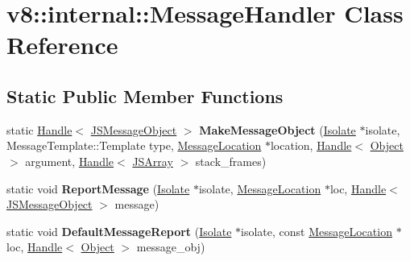 \hypertarget{classv8_1_1internal_1_1_message_handler}{}\section{v8\+:\+:internal\+:\+:Message\+Handler Class Reference}
\label{classv8_1_1internal_1_1_message_handler}
\subsection*{Static Public Member Functions}
\begin{DoxyCompactItemize}
\item 
static \hyperlink{classv8_1_1internal_1_1_handle}{Handle}$<$ \hyperlink{classv8_1_1internal_1_1_j_s_message_object}{J\+S\+Message\+Object} $>$ {\bfseries Make\+Message\+Object} (\hyperlink{classv8_1_1internal_1_1_isolate}{Isolate} $\ast$isolate, Message\+Template\+::\+Template type, \hyperlink{classv8_1_1internal_1_1_message_location}{Message\+Location} $\ast$location, \hyperlink{classv8_1_1internal_1_1_handle}{Handle}$<$ \hyperlink{classv8_1_1internal_1_1_object}{Object} $>$ argument, \hyperlink{classv8_1_1internal_1_1_handle}{Handle}$<$ \hyperlink{classv8_1_1internal_1_1_j_s_array}{J\+S\+Array} $>$ stack\+\_\+frames)\hypertarget{classv8_1_1internal_1_1_message_handler_a312dac0f273ba3598be3a1920fb2d4ef}{}\label{classv8_1_1internal_1_1_message_handler_a312dac0f273ba3598be3a1920fb2d4ef}

\item 
static void {\bfseries Report\+Message} (\hyperlink{classv8_1_1internal_1_1_isolate}{Isolate} $\ast$isolate, \hyperlink{classv8_1_1internal_1_1_message_location}{Message\+Location} $\ast$loc, \hyperlink{classv8_1_1internal_1_1_handle}{Handle}$<$ \hyperlink{classv8_1_1internal_1_1_j_s_message_object}{J\+S\+Message\+Object} $>$ message)\hypertarget{classv8_1_1internal_1_1_message_handler_a2dfe0272545ce1ab459a81f91142cf07}{}\label{classv8_1_1internal_1_1_message_handler_a2dfe0272545ce1ab459a81f91142cf07}

\item 
static void {\bfseries Default\+Message\+Report} (\hyperlink{classv8_1_1internal_1_1_isolate}{Isolate} $\ast$isolate, const \hyperlink{classv8_1_1internal_1_1_message_location}{Message\+Location} $\ast$loc, \hyperlink{classv8_1_1internal_1_1_handle}{Handle}$<$ \hyperlink{classv8_1_1internal_1_1_object}{Object} $>$ message\+\_\+obj)\hypertarget{classv8_1_1internal_1_1_message_handler_ac3187fbef495d0ee967c27a5edb8b591}{}\label{classv8_1_1internal_1_1_message_handler_ac3187fbef495d0ee967c27a5edb8b591}


\end{DoxyCompactItemize}
